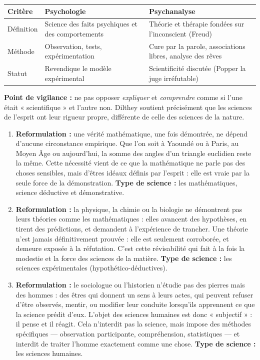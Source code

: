 \documentclass[11pt]{article}
\begin{document}
\begin{corrige}
\begin{center}
\begin{tabularx}{\linewidth}{|l|X|X|}
\hline
\rowcolor{popblueL} \textbf{Critère} & \textbf{Psychologie} & \textbf{Psychanalyse} \\
\hline
Définition & Science des faits psychiques et des comportements & Théorie et thérapie fondées sur l'inconscient (Freud) \\
\hline
Méthode & Observation, tests, expérimentation & Cure par la parole, associations libres, analyse des rêves \\
\hline
Statut & Revendique le modèle expérimental & Scientificité discutée (Popper la juge irréfutable) \\
\hline
\end{tabularx}
\end{center}

\textbf{Point de vigilance :} ne pas opposer \emph{expliquer} et \emph{comprendre} comme si l'une était « scientifique » et l'autre non. Dilthey soutient précisément que les sciences de l'esprit ont leur rigueur propre, différente de celle des sciences de la nature.
\end{corrige}

\begin{corrige}
\begin{enumerate}
\item \textbf{Reformulation :} une vérité mathématique, une fois démontrée, ne dépend d'aucune circonstance empirique. Que l'on soit à Yaoundé ou à Paris, au Moyen Âge ou aujourd'hui, la somme des angles d'un triangle euclidien reste la même. Cette nécessité vient de ce que la mathématique ne parle pas des choses sensibles, mais d'êtres idéaux définis par l'esprit : elle est vraie par la seule force de la démonstration. \textbf{Type de science :} les mathématiques, science déductive et démonstrative.
\item \textbf{Reformulation :} la physique, la chimie ou la biologie ne démontrent pas leurs théories comme les mathématiques : elles avancent des hypothèses, en tirent des prédictions, et demandent à l'expérience de trancher. Une théorie n'est jamais définitivement prouvée : elle est seulement corroborée, et demeure exposée à la réfutation. C'est cette révisabilité qui fait à la fois la modestie et la force des sciences de la matière. \textbf{Type de science :} les sciences expérimentales (hypothético-déductives).
\item \textbf{Reformulation :} le sociologue ou l'historien n'étudie pas des pierres mais des hommes : des êtres qui donnent un sens à leurs actes, qui peuvent refuser d'être observés, mentir, ou modifier leur conduite lorsqu'ils apprennent ce que la science prédit d'eux. L'objet des sciences humaines est donc « subjectif » : il pense et il réagit. Cela n'interdit pas la science, mais impose des méthodes spécifiques — observation participante, compréhension, statistiques — et interdit de traiter l'homme exactement comme une chose. \textbf{Type de science :} les sciences humaines.
\end{enumerate}
\end{corrige}
\end{document}
